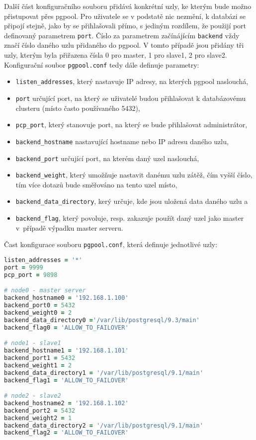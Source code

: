 Další část konfiguračního souboru přidává konkrétní uzly, ke kterým bude možno
přistupovat přes pgpool. Pro uživatele se v podstatě nic nezmění, k databázi se
připojí stejně, jako by se přihlašovali přímo, s jediným rozdílem, že použijí
port definovaný parametrem \texttt{port}. Číslo za parametrem začínájícím
\texttt{backend} vždy značí číslo daného uzlu přidaného do pgpool. V tomto
případě jsou přidány tři uzly, kterým byla přiřazena čísla 0 pro master, 1 pro
slave1, 2 pro slave2. Konfigurační soubor \texttt{pgpool.conf} tedy dále
definuje parametry:
\begin{itemize}
  \item \texttt{listen\_addresses}, který nastavuje IP adresy, na kterých pgpool
    naslouchá,
  \item \texttt{port} určující port, na který se uživatelé budou přihlašovat k
    databázovému clusteru (místo často používaného 5432),
  \item \texttt{pcp\_port}, který stanovuje port, na který se bude přihlašovat
    administrátor,
  \item \texttt{backend\_hostname} nastavující hostname nebo IP adresu daného uzlu,
  \item \texttt{backend\_port} určující port, na kterém daný uzel naslouchá,
  \item \texttt{backend\_weight}, který umožňuje nastavit danému uzlu zátěž, čím
    vyšší číslo, tím více dotazů bude směřováno na tento uzel místo,
  \item \texttt{backend\_data\_directory}, kerý určuje, kde jsou uložená data
    daného uzlu a
  \item \texttt{backend\_flag}, který povoluje, resp. zakazuje použít daný uzel
    jako master v~případě výpadku master serveru.
\end{itemize}

Čast konfigurace souboru \texttt{pgpool.conf}, která definuje jednotlivé uzly:
\begin{lstlisting}[language=ruby]
listen_addresses = '*'
port = 9999
pcp_port = 9898

# node0 - master server
backend_hostname0 = '192.168.1.100'
backend_port0 = 5432
backend_weight0 = 2
backend_data_directory0 ='/var/lib/postgresql/9.3/main'
backend_flag0 = 'ALLOW_TO_FAILOVER'

# node1 - slave1
backend_hostname1 = '192.168.1.101'
backend_port1 = 5432
backend_weight1 = 2
backend_data_directory1 = '/var/lib/postgresql/9.1/main'
backend_flag1 = 'ALLOW_TO_FAILOVER'

# node2 - slave2
backend_hostname2 = '192.168.1.102'
backend_port2 = 5432
backend_weight2 = 1
backend_data_directory2 = '/var/lib/postgresql/9.1/main'
backend_flag2 = 'ALLOW_TO_FAILOVER'
\end{lstlisting}


